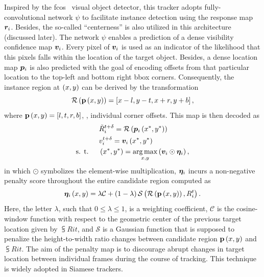 Inspired by the \gls{fcos}~\cite{tian2019fcos} visual object detector, this tracker adopts fully-convolutional network $\psi$ to facilitate instance detection using the response map $\bm{r}_{i}$. Besides, the so-called ``centerness'' is also utilized in this architecture (discussed later). The network $\psi$ enables a prediction of a dense visibility confidence map $\bm{v}_{i}$. Every pixel of $\bm{v}_{i}$ is used as an indicator of the likelihood that this pixels falls within the location of the target object. Besides, a dense location map $\bm{p}_{i}$ is also predicted with the goal of encoding offsets from that particular location to the top-left and bottom right \gls{bbox} corners. Consequently, the instance region at $\left( {x, y} \right)$ can be derived by the transformation
\begin{equation}
    {\mathcal{R}} \left( {\mathbf{p}} \left( x, y \right) \right) =
    \left[ {x - l, y - t, x + r, y + b} \right],
\end{equation}
where ${\mathbf{p}} \left( x, y \right) = \left[ {l, t, r, b} \right]$, \ietext{}, individual corner offsets. This map is then decoded as
\begin{equation}
    \begin{aligned}
                            & {\tilde{R}}_{i}^{t + \delta} =
        {\mathcal{R}} \left( {\bm{p}_{i}} \left( x^*, y^* \right) \right)                                                                      \\
                            & {v}_{i}^{t + \delta} = {\bm{v}_{i}} \left( x^*, y^* \right)                                        \\
        \text{s. t. } \quad & \left( {x^*, y^*} \right) = \underset{x, y}{\operatorname*{arg\,max}} \left( {\bm{v}_{i} \odot \bm{\eta}_{i}} \right),
    \end{aligned}
\end{equation}
in which $\odot$ symbolizes the element-wise multiplication, $\bm{\eta}_{i}$ incurs a non-negative penalty score throughout the entire candidate region computed as
\begin{equation}
    {\bm{\eta}_{i}} \left( x, y \right) =
    \lambda \mathcal{C} +
    \left( {1 - \lambda} \right) {\mathcal{S}} \left( 
        {\mathcal{R}} \left( 
            {\mathbf{p}} \left( x, y \right)
         \right),
        {R}_{i}^{t}
     \right).
\end{equation}
Here, the letter $\lambda$, such that $0 \leq \lambda \leq 1$, is a weighting coefficient, $\mathcal{C}$ is the cosine-window function with respect to the geometric center of the previous target location given by $\subsup{R}{i}{t}$, and $\mathcal{S}$ is a Gaussian function that is supposed to penalize the height-to-width ratio changes between candidate region ${\mathbf{p}} \left( x, y \right)$ and $\subsup{R}{i}{t}$. The aim of the penalty map is to discourage abrupt changes in target location between individual frames during the course of tracking. This technique is widely adopted in Siamese trackers.

